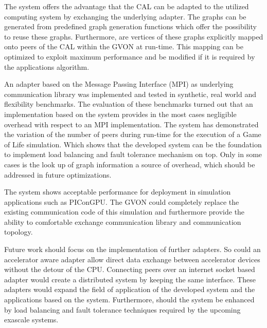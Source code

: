 
The system offers the advantage that the CAL can be adapted to the
utilized computing system by exchanging the underlying adapter.  The
graphs can be generated from predefined graph generation functions
which offer the possibility to reuse these graphs. Furthermore, are
vertices of these graphs explicitly mapped onto peers of the CAL
within the GVON at run-time. This mapping can be optimized to
exploit maximum performance and be modified if it is required by the
applications algorithm.


An adapter based on the Message Passing Interface (MPI) as
underlying communication library was implemented and tested in
synthetic, real world and flexibility benchmarks. The evaluation of
these benchmarks turned out that an implementation based on the
system provides in the most cases negligible overhead with respect
to an MPI implementation.  The system has demonstrated the variation
of the number of peers during run-time for the execution of a Game
of Life simulation. Which shows that the developed system can be the
foundation to implement load balancing and fault tolerance mechanism
on top.  Only in some cases is the look up of graph information a
source of overhead, which should be addressed in future
optimizations.


The system shows acceptable performance for deployment in
simulation applications such as PIConGPU. The GVON could completely
replace the existing communication code of this simulation and
furthermore provide the ability to comfortable exchange
communication library and communication topology.

Future work should focus on the implementation of further adapters. So
could an accelerator aware adapter allow direct data exchange between
accelerator devices without the detour of the CPU. Connecting peers
over an internet socket based adapter would create a distributed
system by keeping the same interface.  These adapters would expand the
field of application of the developed system and the applications
based on the system.  Furthermore, should the system be enhanced by
load balancing and fault tolerance techniques required by the upcoming
exascale systems.
  

\cleardoublepage

